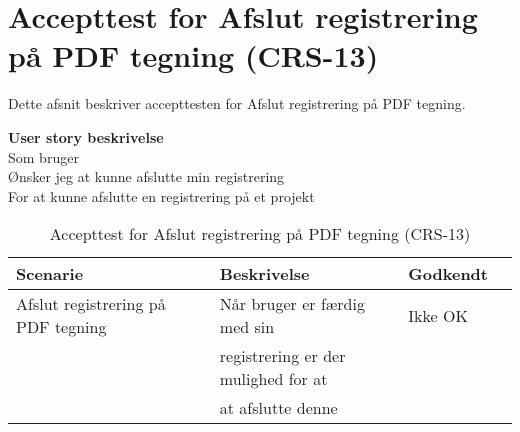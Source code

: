 \section{Accepttest for Afslut registrering på PDF tegning (CRS-13)}
Dette afsnit beskriver accepttesten for Afslut registrering på PDF tegning.

\textbf{User story beskrivelse} \\
Som bruger \\
Ønsker jeg at kunne afslutte min registrering \\
For at kunne afslutte en registrering på et projekt

\begin{table}[H]
	\centering
	\begin{tabular}{|ll|l|ll|} \hline
		\textbf{Scenarie} &  & \textbf{Beskrivelse}&  \textbf{Godkendt}&  \\ \hline
		Afslut registrering på PDF tegning&  &  Når bruger er færdig med sin &  Ikke OK&  \\
		& & registrering er der mulighed for at& & \\
		& & at afslutte denne& & \\ \hline
	\end{tabular}
	\caption{Accepttest for Afslut registrering på PDF tegning (CRS-13)}
	\label{AcceptAfslutPDF}
\end{table}